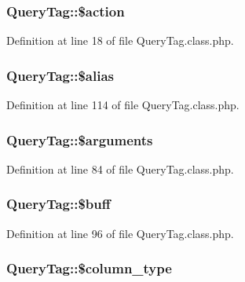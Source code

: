 \subsubsection[{\$action}]{\setlength{\rightskip}{0pt plus 5cm}Query\+Tag\+::\$action}\label{classQueryTag_a5e2e78261306a4a4db69c643e9524e60}


Definition at line 18 of file Query\+Tag.\+class.\+php.

\hypertarget{classQueryTag_a86de241a75c3037c30272c7eb4a2cfbc}{}
\subsubsection[{\$alias}]{\setlength{\rightskip}{0pt plus 5cm}Query\+Tag\+::\$alias}\label{classQueryTag_a86de241a75c3037c30272c7eb4a2cfbc}


Definition at line 114 of file Query\+Tag.\+class.\+php.

\hypertarget{classQueryTag_a236e4bf42871aeac6c84f4dbbd1e6cb2}{}
\subsubsection[{\$arguments}]{\setlength{\rightskip}{0pt plus 5cm}Query\+Tag\+::\$arguments}\label{classQueryTag_a236e4bf42871aeac6c84f4dbbd1e6cb2}


Definition at line 84 of file Query\+Tag.\+class.\+php.

\hypertarget{classQueryTag_abe10d8fd334fac380dd5540b2c0bdcc8}{}
\subsubsection[{\$buff}]{\setlength{\rightskip}{0pt plus 5cm}Query\+Tag\+::\$buff}\label{classQueryTag_abe10d8fd334fac380dd5540b2c0bdcc8}


Definition at line 96 of file Query\+Tag.\+class.\+php.

\hypertarget{classQueryTag_a617db2d7a2db9fddba0959b43cc40458}{}
\subsubsection[{\$column\+\_\+type}]{\setlength{\rightskip}{0pt plus 5cm}Query\+Tag\+::\$column\+\_\+type}\label{classQueryTag_a617db2d7a2db9fddba0959b43cc40458}


